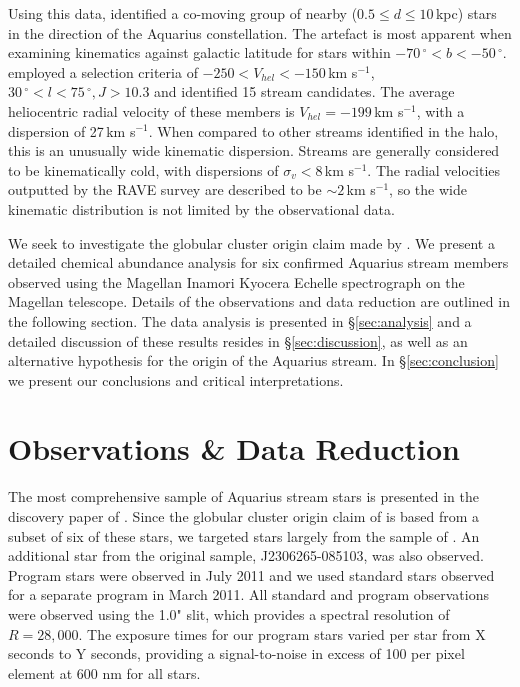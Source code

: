 \documentclass{emulateapj}
\begin{document}
Using this data, \citet{Williams;et-al_2011} identified a co-moving group of nearby ($0.5 \leq d \leq 10$\,kpc) stars in the direction of the Aquarius constellation. The artefact is most apparent when examining kinematics against galactic latitude for stars within $-70\,^\circ < b < -50\,^\circ$. \citet{Williams;et-al_2011} employed a selection criteria of $-250 < V_{hel} < -150$\,km s$^{-1}$, $30\,^\circ < l < 75\,^\circ, J > 10.3$ and identified 15 stream candidates. The average heliocentric radial velocity of these members is $V_{hel} = -199$\,km s$^{-1}$, with a dispersion of 27\,km s$^{-1}$. When compared to other streams identified in the halo, this is an unusually wide kinematic dispersion. Streams are generally considered to be kinematically cold, with dispersions of $\sigma_v < 8$\,km s$^{-1}$. The radial velocities outputted by the RAVE survey are described to be $\sim{}2$\,km s$^{-1}$, so the wide kinematic distribution is not limited by the observational data.






We seek to investigate the globular cluster origin claim made by \citet{de_Boer;et-al_2012}. We present a detailed chemical abundance analysis for six confirmed Aquarius stream members observed using the Magellan Inamori Kyocera Echelle spectrograph \citep{Bernstein;et-al_2002} on the Magellan telescope. Details of the observations and data reduction are outlined in the following section. The data analysis is presented in \S\ref{sec:analysis} and a detailed discussion of these results resides in \S\ref{sec:discussion}, as well as an alternative hypothesis for the origin of the Aquarius stream. In \S\ref{sec:conclusion} we present our conclusions and critical interpretations.

\section{Observations \& Data Reduction}

The most comprehensive sample of Aquarius stream stars is presented in the discovery paper of \citet{Williams;et-al_2011}. Since the globular cluster origin claim of \citet{de_Boer;et-al_2012} is based from a subset of six of these stars, we targeted stars largely from the sample of \citet{de_Boer;et-al_2012}. An additional star from the original \citet{Williams;et-al_2011} sample, J2306265-085103, was also observed. Program stars were observed in July 2011 and we used standard stars observed for a separate program in March 2011. All standard and program observations were observed using the 1.0" slit, which provides a spectral resolution of $R = 28,000$. The exposure times for our program stars varied per star from X seconds to Y seconds, providing a signal-to-noise in excess of 100 per pixel element at 600 nm for all stars.
\end{document}
